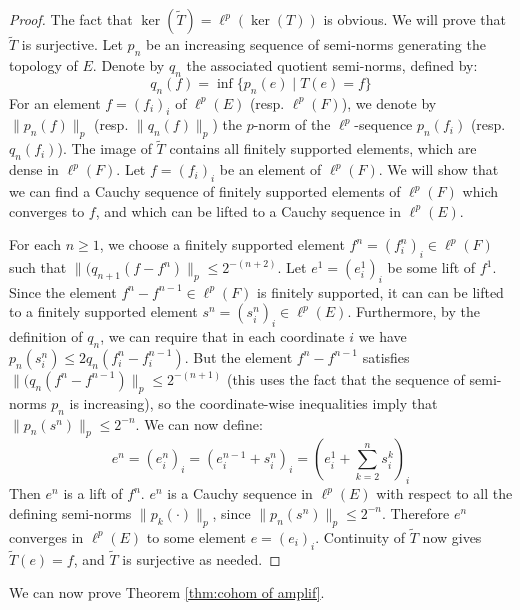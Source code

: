 \documentclass[12pt,reqno]{amsart}
\theoremstyle{definition}
\begin{document}
\begin{proof}
    The fact that $\ker(\tilde{T}) = \ell^p(\ker(T))$ is obvious. We will prove that $\tilde{T}$ is surjective. Let $p_n$ be an increasing sequence of semi-norms generating the topology of $E$. Denote by $q_n$ the associated quotient semi-norms, defined by:
    $$q_n(f) = \inf \{p_n(e) \mid T(e) = f\}$$
    For an element $f=(f_i)_i$ of $\ell^p(E)$ (resp. $\ell^p(F)$), we denote by $\|p_n(f)\|_p$ (resp. $\|q_n(f)\|_p$) the $p$-norm of the $\ell^p$-sequence $p_n(f_i)$ (resp. $q_n(f_i)$). The image of $\tilde{T}$ contains all finitely supported elements, which are dense in $\ell^p(F)$. Let $f=(f_i)_i$ be an element of $\ell^p(F)$. We will show that we can find a Cauchy sequence of finitely supported elements of $\ell^p(F)$ which converges to $f$, and which can be lifted to a Cauchy sequence in $\ell^p(E)$.
    
    For each $n \geq 1$, we choose a finitely supported element $f^n=(f_i^n)_i \in \ell^p(F)$ such that $\|(q_{n+1}(f-f^n)\|_p \leq 2^{-(n+2)}$. Let $e^1=(e_i^1)_i$ be some lift of $f^1$. Since the element $f^n-f^{n-1} \in \ell^p(F)$ is finitely supported, it can can be lifted to a finitely supported element $s^n=(s_i^n)_i \in \ell^p(E)$. Furthermore, by the definition of $q_n$, we can require that in each coordinate $i$ we have $p_n(s_i^n) \leq 2q_n(f_i^{n} -f_i^{n-1})$. But the element $f^n-f^{n-1}$ satisfies $\|(q_n(f^n-f^{n-1})\|_p \leq 2^{-(n+1)}$ (this uses the fact that the sequence of semi-norms $p_n$ is increasing), so the coordinate-wise inequalities imply that $\|p_n(s^n)\|_p \leq 2^{-n}$. We can now define: $$e^n=(e_i^n)_i = (e_i^{n-1}+s_i^n)_i = (e_i^1 + \sum_{k=2}^n s_i^k )_i$$
    Then $e^n$ is a lift of $f^n$. $e^n$ is a Cauchy sequence in $\ell^p(E)$ with respect to all the defining semi-norms $\|p_k(\cdot)\|_p$, since $\|p_n(s^n)\|_p \leq 2^{-n}$. Therefore $e^n$ converges in $\ell^p(E)$ to some element $e=(e_i)_i$. Continuity of $\tilde T$ now gives $\tilde T(e)=f$, and $\tilde T$ is surjective as needed.
\end{proof}
We can now prove Theorem \ref{thm:cohom of amplif}.
\end{document}
